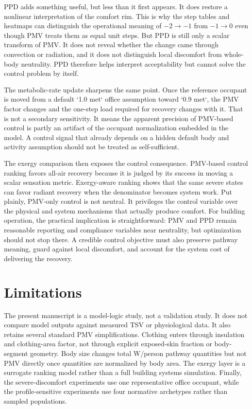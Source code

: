 \documentclass[preprint,authoryear,12pt]{elsarticle}
\begin{document}
PPD adds something useful, but less than it first appears. It does restore a nonlinear interpretation of the comfort rim. This is why the step tables and heatmaps can distinguish the operational meaning of $-2 \rightarrow -1$ from $-1 \rightarrow 0$ even though PMV treats them as equal unit steps. But PPD is still only a scalar transform of PMV. It does not reveal whether the change came through convection or radiation, and it does not distinguish local discomfort from whole-body neutrality. PPD therefore helps interpret acceptability but cannot solve the control problem by itself.

The metabolic-rate update sharpens the same point. Once the reference occupant is moved from a default `1.0 met` office assumption toward `0.9 met`, the PMV factor changes and the one-step load required for recovery changes with it. That is not a secondary sensitivity. It means the apparent precision of PMV-based control is partly an artifact of the occupant normalization embedded in the model. A control signal that already depends on a hidden default body and activity assumption should not be treated as self-sufficient.

The exergy comparison then exposes the control consequence. PMV-based control ranking favors all-air recovery because it is judged by its success in moving a scalar sensation metric. Exergy-aware ranking shows that the same severe states can favor radiant recovery when the denominator becomes system work. Put plainly, PMV-only control is not neutral. It privileges the control variable over the physical and system mechanisms that actually produce comfort. For building operation, the practical implication is straightforward: PMV and PPD remain reasonable reporting and compliance variables near neutrality, but optimization should not stop there. A credible control objective must also preserve pathway meaning, guard against local discomfort, and account for the system cost of delivering the recovery.

\section{Limitations}

The present manuscript is a model-logic study, not a validation study. It does not compare model outputs against measured TSV or physiological data. It also retains several standard PMV simplifications. Clothing enters through insulation and clothing-area factor, not through explicit exposed-skin fraction or body-segment geometry. Body size changes total \si{W/person} pathway quantities but not PMV directly once quantities are normalized by body area. The exergy layer is a surrogate ranking model rather than a full building systems simulation. Finally, the severe-discomfort experiments use one representative office occupant, while the profile-sensitive experiments use four normative archetypes rather than sampled populations.
\end{document}
